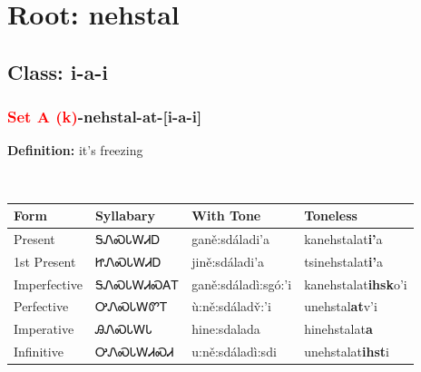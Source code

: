 \needspace{4in}
\section*{Root: nehstal}
\nopagebreak
{}
\needspace{3in}
\subsection*{Class: i-a-i}
\nopagebreak
\needspace{2in}
\subsubsection*{\textcolor{Red}{Set A (k)}{-}\textbf{nehstal}{-}at{-}[i-a-i]}
\nopagebreak
\textbf{Definition: } it{\textquoteright}s freezing
\\[0.5em]
\begin{tabularx}{\textwidth}{l X X X}%
\toprule%
\textbf{Form}&\textbf{Syllabary}&\textbf{With Tone}&\textbf{Toneless}\\%
\midrule%
Present&ᎦᏁᏍᏓᎳᏗᎠ&ganě:sdáladi’a&kanehstalat\textbf{i'}a\\%
1st Present&ᏥᏁᏍᏓᎳᏗᎠ&jině:sdáladi’a&tsinehstalat\textbf{i'}a\\%
Imperfective&ᎦᏁᏍᏓᎳᏗᏍᎪᎢ&ganě:sdáladì:sgó:’i&kanehstalat\textbf{ihsk}o'i\\%
Perfective&ᎤᏁᏍᏓᎳᏛᎢ&ù:ně:sdáladv̌:’i&unehstal\textbf{at}v'i\\%
Imperative&ᎯᏁᏍᏓᎳᏓ&hine:sdalada&hinehstalat\textbf{a}\\%
Infinitive&ᎤᏁᏍᏓᎳᏗᏍᏗ&u:ně:sdáladì:sdi&unehstalat\textbf{ihst}i\\%
\bottomrule%
\end{tabularx}
\\[1em]